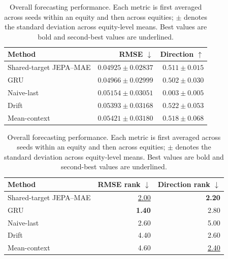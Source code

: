 \begin{table}[t]
\centering
\small
\caption{Overall forecasting performance. Each metric is first averaged across seeds within an equity and then across equities; $\pm$ denotes the standard deviation across equity-level means. Best values are bold and second-best values are underlined.}
\label{tab:main_metrics}
\begin{tabular}{lrr}
\toprule
Method & RMSE $\downarrow$ & Direction $\uparrow$ \\
\midrule
Shared-target JEPA--MAE & \textbf{$0.04925 \pm 0.02837$} & $0.511 \pm 0.015$ \\
GRU & \underline{$0.04966 \pm 0.02999$} & $0.502 \pm 0.030$ \\
Naive-last & $0.05154 \pm 0.03051$ & $0.003 \pm 0.005$ \\
Drift & $0.05393 \pm 0.03168$ & \textbf{$0.522 \pm 0.053$} \\
Mean-context & $0.05421 \pm 0.03180$ & \underline{$0.518 \pm 0.068$} \\
\bottomrule
\end{tabular}
\par\medskip
\begin{tabular}{lrr}
\toprule
Method & RMSE rank $\downarrow$ & Direction rank $\downarrow$ \\
\midrule
Shared-target JEPA--MAE & \underline{2.00} & \textbf{2.20} \\
GRU & \textbf{1.40} & 2.80 \\
Naive-last & 2.60 & 5.00 \\
Drift & 4.40 & 2.60 \\
Mean-context & 4.60 & \underline{2.40} \\
\bottomrule
\end{tabular}
\end{table}
